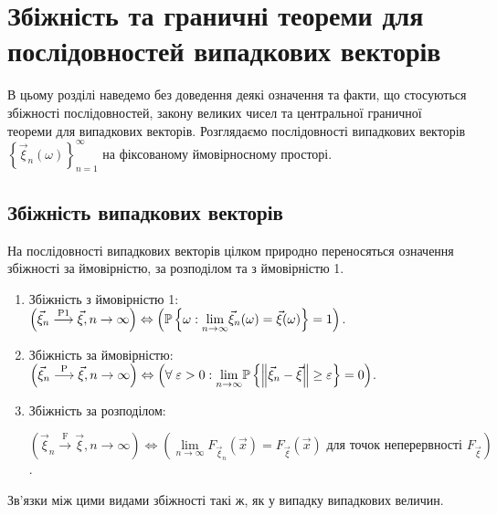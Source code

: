 \section{Збіжність та граничні теореми для послідовностей випадкових векторів}
В цьому розділі наведемо без доведення деякі означення та факти, що стосуються збіжності
послідовностей, закону великих чисел та центральної граничної теореми для випадкових векторів.
Розглядаємо послідовності випадкових векторів $\left\{ \vec{\xi}_n (\omega)\right\}_{n=1}^{\infty}$ на фіксованому
ймовірносному просторі.
\subsection{Збіжність випадкових векторів}
На послідовності випадкових векторів цілком природно переносяться означення збіжності за ймовірністю, за розподілом та з ймовірністю 1.
\begin{enumerate}
    \item Збіжність з ймовірністю 1: $\left(\vec{\xi}_n \overset{\mathrm{P1}}{\longrightarrow} \vec{\xi}, n \to \infty\right) \Leftrightarrow 
    \left(\P\left\{ \omega: \underset{n\to\infty}{\lim} \vec{\xi}_n(\omega) = \vec{\xi}(\omega)\right\} = 1\right)$.
    \item Збіжність за ймовірністю: $\left(\vec{\xi}_n \overset{\mathrm{P}}{\longrightarrow} \vec{\xi}, n \to\infty\right) \Leftrightarrow
    \left(\forall \; \varepsilon > 0: \underset{n \to \infty}{\lim} \P\left\{\left\Vert\vec{\xi}_n - \vec{\xi}\right\Vert \geq \varepsilon\right\}= 0\right)$.
    \item Збіжність за розподілом: 
    
    $\left(\vec{\xi}_n \overset{\mathrm{F}}{\longrightarrow} \vec{\xi}, n \to\infty\right) \Leftrightarrow
    \left(\underset{n\to\infty}{\lim}F_{\vec{\xi}_n}(\vec{x}) = F_{\vec{\xi}}(\vec{x}) \text{ для точок неперервності } F_{\vec{\xi}}\right)$.
\end{enumerate}
Зв'язки між цими видами збіжності такі ж, як у випадку випадкових величин.

